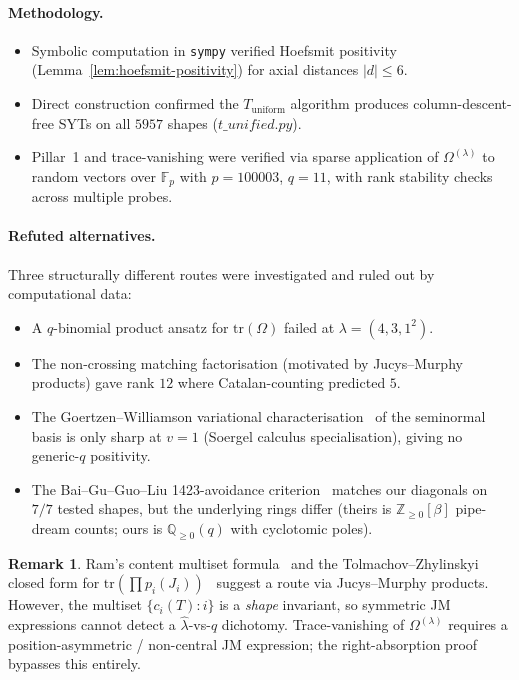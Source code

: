 \documentclass[11pt]{article}
\theoremstyle{definition}
\newtheorem{remark}[theorem]{Remark}
\newcommand{\Om}{\Omega}
\newcommand{\bla}{\widehat\lambda}
\newcommand{\tr}{\mathrm{tr}}
\newcommand{\Tunif}{T_{\mathrm{uniform}}}
\begin{document}
\paragraph{Methodology.}
\begin{itemize}[topsep=2pt,itemsep=2pt]
\item Symbolic computation in \texttt{sympy} verified Hoefsmit positivity (Lemma~\ref{lem:hoefsmit-positivity}) for axial distances $|d| \le 6$.
\item Direct construction confirmed the $\Tunif$ algorithm produces column-descent-free SYTs on all $5957$ shapes ($t\_unified.py$).
\item Pillar~1 and trace-vanishing were verified via sparse application of $\Om^{(\lambda)}$ to random vectors over $\mathbb{F}_p$ with $p = 100003$, $q = 11$, with rank stability checks across multiple probes.
\end{itemize}

\paragraph{Refuted alternatives.}  Three structurally different routes were investigated and ruled out by computational data:
\begin{itemize}[topsep=2pt,itemsep=2pt]
\item A $q$-binomial product ansatz for $\tr(\Om)$ failed at $\lambda = (4,3,1^2)$.
\item The non-crossing matching factorisation (motivated by Jucys--Murphy products) gave rank $12$ where Catalan-counting predicted $5$.
\item The Goertzen--Williamson variational characterisation~\cite{goertzenwilliamson2026variational} of the seminormal basis is only sharp at $v = 1$ (Soergel calculus specialisation), giving no generic-$q$ positivity.
\item The Bai--Gu--Guo--Liu 1423-avoidance criterion~\cite{baigugou2026} matches our diagonals on $7/7$ tested shapes, but the underlying rings differ (theirs is $\mathbb{Z}_{\ge 0}[\beta]$ pipe-dream counts; ours is $\mathbb{Q}_{\ge 0}(q)$ with cyclotomic poles).
\end{itemize}

\begin{remark}\label{rem:ram-jm-shadow}
Ram's content multiset formula~\cite{ram2003Skew} and the Tolmachov--Zhylinskyi closed form for $\tr(\prod p_i(J_i))$~\cite{tolmachov2025markov} suggest a route via Jucys--Murphy products.  However, the multiset $\{c_i(T) : i\}$ is a \emph{shape} invariant, so symmetric JM expressions cannot detect a $\bla$-vs-$q$ dichotomy.  Trace-vanishing of $\Om^{(\lambda)}$ requires a position-asymmetric / non-central JM expression; the right-absorption proof bypasses this entirely.
\end{remark}
\end{document}
